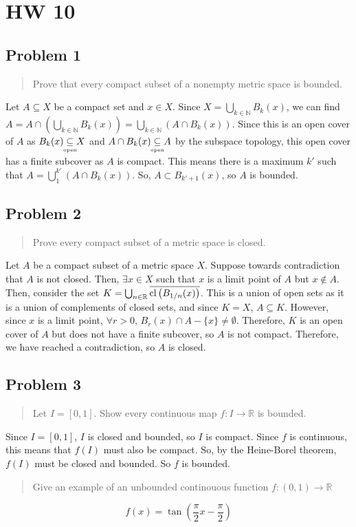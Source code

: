 \documentclass[8pt]{extarticle}
\newcommand{\plain}[1]{\textrm{#1}}
\newcommand{\open}{\underset{\clap{\tiny open}}{\subseteq}}
\begin{document}
{\section*{HW 10}
\subsection*{Problem 1}
\begin{quote}
	Prove that every compact subset of a nonempty metric space is bounded.
\end{quote}
Let $A \subseteq X$ be a compact set and $x\in X$. Since $X = \bigcup_{k\in \mathbb{N}}B_{k}(x)$, we can find $A = A\cap \left(\bigcup_{k\in\mathbb{N}}B_{k}(x)\right) = \bigcup_{k\in \mathbb{N}}(A\cap B_{k}(x))$. Since this is an open cover of $A$ as $B_{k}(x)\open X$ and $A\cap B_{k}(x)\open A$ by the subspace topology, this open cover has a finite subcover as $A$ is compact. This means there is a maximum $k'$ such that $A = \bigcup_{1}^{k'}(A\cap B_{k}(x))$. So, $A\subset B_{k'+1}(x)$, so $A$ is bounded.
\subsection*{Problem 2}%
\begin{quote}
	Prove every compact subset of a metric space is closed.
\end{quote}
Let $A$ be a compact subset of a metric space $X$. Suppose towards contradiction that $A$ is not closed. Then, $\exists x\in X$ such that $x$ is a limit point of $A$ but $x\not\in A$. Then, consider the set $K = \bigcup_{n\in\mathbb{R}}\overline{\plain{cl}\left(B_{\tiny 1/n}(x)\right)}$. This is a union of open sets as it is a union of complements of closed sets, and since $K = X$, $A\subseteq K$. However, since $x$ is a limit point, $\forall r>0$, $B_{r}(x)\cap A-\{x\} \neq \emptyset$. Therefore, $K$ is an open cover of $A$ but does not have a finite subcover, so $A$ is not compact. Therefore, we have reached a contradiction, so $A$ is closed.
\subsection*{Problem 3}%
\begin{quote}
	Let $I = [0,1]$. Show every continuous map $f:I\rightarrow \mathbb{R}$ is bounded.
\end{quote}
Since $I = [0,1]$, $I$ is closed and bounded, so $I$ is compact. Since $f$ is continuous, this means that $f(I)$ must also be compact. So, by the Heine-Borel theorem, $f(I)$ must be closed and bounded. So $f$ is bounded.
\begin{quote}
	Give an example of an unbounded continouous function $f:(0,1)\rightarrow \mathbb{R}$
\end{quote}
\[f(x) = \tan\left(\frac{\pi}{2}x - \frac{\pi}{2}\right)\]
}
\end{document}
